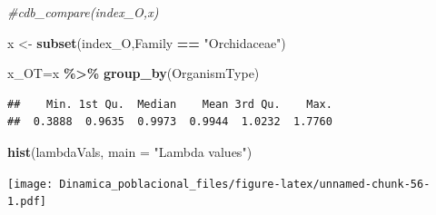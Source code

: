 \documentclass[
]{book}
\newenvironment{Shaded}{\begin{snugshade}}{\end{snugshade}}
\newcommand{\AttributeTok}[1]{\textcolor[rgb]{0.13,0.29,0.53}{#1}}
\newcommand{\CommentTok}[1]{\textcolor[rgb]{0.56,0.35,0.01}{\textit{#1}}}
\newcommand{\ConstantTok}[1]{\textcolor[rgb]{0.56,0.35,0.01}{#1}}
\newcommand{\FunctionTok}[1]{\textcolor[rgb]{0.13,0.29,0.53}{\textbf{#1}}}
\newcommand{\NormalTok}[1]{#1}
\newcommand{\OtherTok}[1]{\textcolor[rgb]{0.56,0.35,0.01}{#1}}
\newcommand{\SpecialCharTok}[1]{\textcolor[rgb]{0.81,0.36,0.00}{\textbf{#1}}}
\newcommand{\StringTok}[1]{\textcolor[rgb]{0.31,0.60,0.02}{#1}}
\theoremstyle{definition}
\theoremstyle{definition}
\theoremstyle{definition}
\theoremstyle{definition}
\theoremstyle{remark}
\begin{document}
\begin{Shaded}
\begin{Highlighting}[]
\CommentTok{\#cdb\_compare(index\_O,x)}


\NormalTok{x }\OtherTok{\textless{}{-}} \FunctionTok{subset}\NormalTok{(index\_O,Family }\SpecialCharTok{==} \StringTok{"Orchidaceae"}\NormalTok{)}

\NormalTok{x\_OT}\OtherTok{=}\NormalTok{x }\SpecialCharTok{\%\textgreater{}\%} 
  \FunctionTok{group\_by}\NormalTok{(OrganismType)}
\end{Highlighting}
\end{Shaded}

\begin{Shaded}
\end{Shaded}

\begin{verbatim}
##    Min. 1st Qu.  Median    Mean 3rd Qu.    Max. 
##  0.3888  0.9635  0.9973  0.9944  1.0232  1.7760
\end{verbatim}

\begin{Shaded}
\begin{Highlighting}[]
\FunctionTok{hist}\NormalTok{(lambdaVals, }\AttributeTok{main =} \StringTok{"Lambda values"}\NormalTok{)}
\end{Highlighting}
\end{Shaded}

\texttt{[image: Dinamica\_poblacional\_files/figure-latex/unnamed-chunk-56-1.pdf]}
\end{document}
